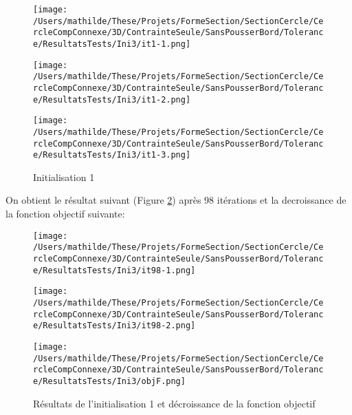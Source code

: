 \documentclass[11pt,a4paper]{article}
\begin{document}
\begin{figure}[H]
	\label{fig:cercleseul3Dini1}
	\begin{minipage}{0.32\textwidth}
		\centering
		\texttt{[image: /Users/mathilde/These/Projets/FormeSection/SectionCercle/CercleCompConnexe/3D/ContrainteSeule/SansPousserBord/Tolerance/ResultatsTests/Ini3/it1-1.png]}
	\end{minipage}
	\begin{minipage}{0.32\textwidth}
		\centering
		\texttt{[image: /Users/mathilde/These/Projets/FormeSection/SectionCercle/CercleCompConnexe/3D/ContrainteSeule/SansPousserBord/Tolerance/ResultatsTests/Ini3/it1-2.png]}
	\end{minipage}
	\begin{minipage}{0.32\textwidth}
		\centering
		\texttt{[image: /Users/mathilde/These/Projets/FormeSection/SectionCercle/CercleCompConnexe/3D/ContrainteSeule/SansPousserBord/Tolerance/ResultatsTests/Ini3/it1-3.png]}
	\end{minipage}	
	\caption{Initialisation 1}	
\end{figure}

On obtient le résultat suivant (Figure \ref{fig:cercleseul3Dini1Fin}) après 98 itérations et la decroissance de la fonction objectif suivante:

\begin{figure}[H]
	\label{fig:cercleseul3Dini1Fin}
	\begin{minipage}{0.33\textwidth}
		\centering
		\texttt{[image: /Users/mathilde/These/Projets/FormeSection/SectionCercle/CercleCompConnexe/3D/ContrainteSeule/SansPousserBord/Tolerance/ResultatsTests/Ini3/it98-1.png]}
	\end{minipage}
	\begin{minipage}{0.33\textwidth}
		\centering
		\texttt{[image: /Users/mathilde/These/Projets/FormeSection/SectionCercle/CercleCompConnexe/3D/ContrainteSeule/SansPousserBord/Tolerance/ResultatsTests/Ini3/it98-2.png]}
	\end{minipage}	
	\begin{minipage}{0.33\textwidth}
		\centering
		\texttt{[image: /Users/mathilde/These/Projets/FormeSection/SectionCercle/CercleCompConnexe/3D/ContrainteSeule/SansPousserBord/Tolerance/ResultatsTests/Ini3/objF.png]}
	\end{minipage}	
	\caption{Résultats de l'initialisation 1 et décroissance de la fonction objectif}	
\end{figure}
\end{document}
